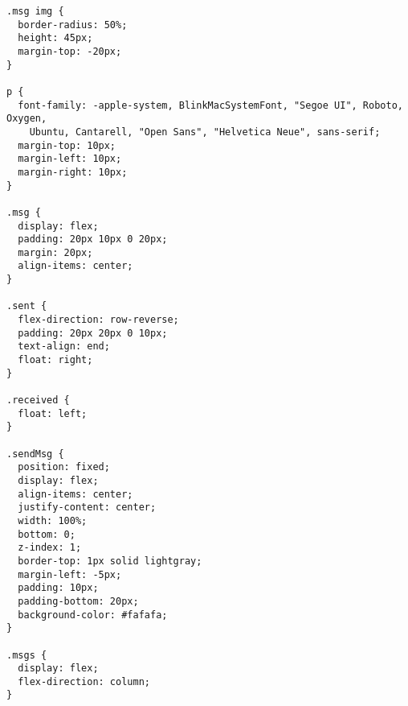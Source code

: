 \begin{verbatim}
.msg img {
  border-radius: 50%;
  height: 45px;
  margin-top: -20px;
}

p {
  font-family: -apple-system, BlinkMacSystemFont, "Segoe UI", Roboto, Oxygen,
    Ubuntu, Cantarell, "Open Sans", "Helvetica Neue", sans-serif;
  margin-top: 10px;
  margin-left: 10px;
  margin-right: 10px;
}

.msg {
  display: flex;
  padding: 20px 10px 0 20px;
  margin: 20px;
  align-items: center;
}

.sent {
  flex-direction: row-reverse;
  padding: 20px 20px 0 10px;
  text-align: end;
  float: right;
}

.received {
  float: left;
}

.sendMsg {
  position: fixed;
  display: flex;
  align-items: center;
  justify-content: center;
  width: 100%;
  bottom: 0;
  z-index: 1;
  border-top: 1px solid lightgray;
  margin-left: -5px;
  padding: 10px;
  padding-bottom: 20px;
  background-color: #fafafa;
}

.msgs {
  display: flex;
  flex-direction: column;
}
\end{verbatim}